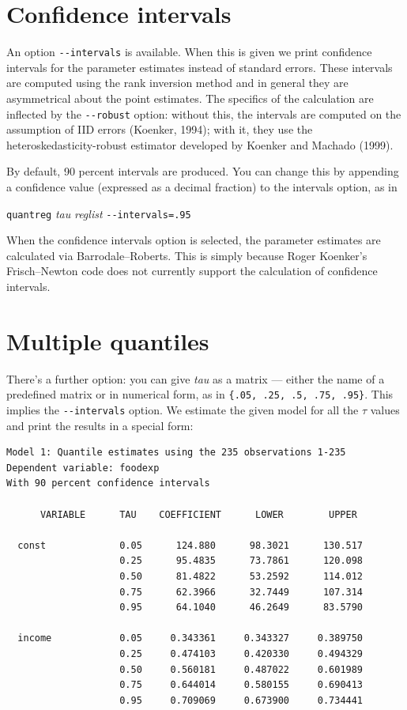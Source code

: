 \section{Confidence intervals}

An option \verb|--intervals| is available.  When this is given we
print confidence intervals for the parameter estimates instead of
standard errors.  These intervals are computed using the rank
inversion method and in general they are asymmetrical about the point
estimates.  The specifics of the calculation are inflected by the
\verb|--robust| option: without this, the intervals are computed on
the assumption of IID errors (Koenker, 1994); with it, they use the
heteroskedasticity-robust estimator developed by Koenker and Machado
(1999).

By default, 90 percent intervals are produced.  You can change this by
appending a confidence value (expressed as a decimal fraction) to the
intervals option, as in

\vspace{1em}
\noindent
\qquad \texttt{quantreg} \textsl{tau} \textsl{reglist} \verb|--intervals=.95|
\vspace{1em}

When the confidence intervals option is selected, the parameter
estimates are calculated via Barrodale--Roberts.  This is simply
because Roger Koenker's Frisch--Newton code does not currently support
the calculation of confidence intervals.

\section{Multiple quantiles}

There's a further option: you can give \textsl{tau} as a
matrix --- either the name of a predefined matrix or in numerical form,
as in \verb+{.05, .25, .5, .75, .95}+.  This implies the
\verb|--intervals| option.  We estimate the given model for all
the $\tau$ values and print the results in a special form:

{\small
\begin{verbatim}
Model 1: Quantile estimates using the 235 observations 1-235
Dependent variable: foodexp
With 90 percent confidence intervals

      VARIABLE      TAU    COEFFICIENT      LOWER        UPPER

  const             0.05      124.880      98.3021      130.517
                    0.25      95.4835      73.7861      120.098
                    0.50      81.4822      53.2592      114.012
                    0.75      62.3966      32.7449      107.314
                    0.95      64.1040      46.2649      83.5790

  income            0.05     0.343361     0.343327     0.389750
                    0.25     0.474103     0.420330     0.494329
                    0.50     0.560181     0.487022     0.601989
                    0.75     0.644014     0.580155     0.690413
                    0.95     0.709069     0.673900     0.734441
\end{verbatim}
}

